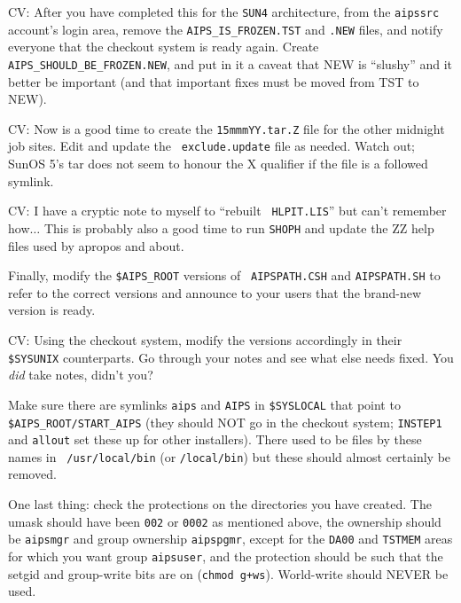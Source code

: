 \item{CV:} After you have completed this for the {\tt SUN4}
	   architecture, from the {\tt aipssrc} account's login area,
	   remove the {\tt AIPS\_IS\_FROZEN.TST} and {\tt .NEW} files,
	   and notify everyone that the checkout system is ready again.
	   Create {\tt AIPS\_SHOULD\_BE\_FROZEN.NEW}, and put in it a
	   caveat that NEW is ``slushy'' and it better be important (and
	   that important fixes must be moved from TST to NEW).

\item{CV:} Now is a good time to create the {\tt 15mmmYY.tar.Z} file for
	   the other midnight job sites.  Edit and update the {\tt
	   exclude.update} file as needed.  Watch out; SunOS 5's tar
	   does not seem to honour the X qualifier if the file is a
	   followed symlink.

\item{CV:} I have a cryptic note to myself to ``rebuilt {\tt
	   HLPIT.LIS}'' but can't remember how$\dots$ This is probably
	   also a good time to run {\tt SHOPH} and update the ZZ help
	   files used by apropos and about. \medskip

\noindent Finally, modify the {\tt\$AIPS\_ROOT} versions of {\tt
AIPSPATH.CSH} and {\tt AIPSPATH.SH} to refer to the correct versions and
announce to your users that the brand-new version is ready.

\item{CV:} Using the checkout system, modify the versions accordingly
           in their {\tt\$SYSUNIX} counterparts.  Go through your notes
           and see what else needs fixed.  You {\it did\/} take notes,
           didn't you?\medskip

\noindent Make sure there are symlinks {\tt aips} and {\tt AIPS} in
{\tt\$SYSLOCAL} that point to {\tt\$AIPS\_ROOT/START\_AIPS} (they should
NOT go in the checkout system; {\tt INSTEP1} and {\tt allout} set these
up for other installers).  There used to be files by these names in {\tt
/usr/local/bin} (or {\tt /local/bin}) but these should almost certainly
be removed.

One last thing: check the protections on the directories you have
created.  The umask should have been {\tt 002} or {\tt 0002} as
mentioned above, the ownership should be {\tt aipsmgr} and group
ownership {\tt aipspgmr}, except for the {\tt DA00} and {\tt TSTMEM}
areas for which you want group {\tt aipsuser}, and the protection should
be such that the setgid and group-write bits are on ({\tt chmod g+ws}).
World-write should NEVER be used.

